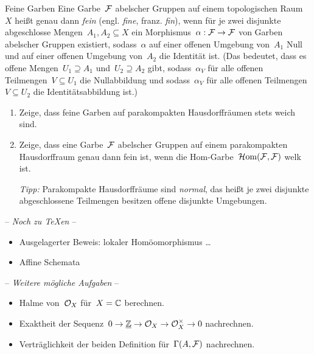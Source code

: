 \documentclass{uebblatt}
\begin{document}
\begin{aufgabe}{Feine Garben}
Eine Garbe~$\mathcal{F}$ abelscher Gruppen auf einem topologischen Raum~$X$ heißt genau dann \emph{fein}
(engl. \emph{fine}, franz. \emph{fin}), wenn für je zwei disjunkte abgeschlosse
Mengen~$A_1, A_2 \subseteq X$ ein Morphismus~$\alpha : \mathcal{F} \to \mathcal{F}$ von Garben
abelscher Gruppen existiert, sodass~$\alpha$ auf einer offenen Umgebung
von~$A_1$ Null und auf einer offenen Umgebung von~$A_2$ die Identität ist.
(Das bedeutet, dass es offene Mengen~$U_1 \supseteq A_1$
und~$U_2 \supseteq A_2$ gibt, sodass~$\alpha_V$ für alle offenen Teilmengen~$V
\subseteq U_1$ die Nullabbildung und sodass~$\alpha_V$ für alle offenen
Teilmengen~$V \subseteq U_2$ die Identitätsabbildung ist.)

\begin{enumerate}
\item Zeige, dass feine Garben auf parakompakten Hausdorffräumen stets weich
sind.
\item Zeige, dass eine Garbe~$\mathcal{F}$ abelscher Gruppen auf einem parakompakten
Hausdorffraum genau dann fein ist, wenn die Hom-Garbe~$\mathcal{H}\mathrm{om}(\mathcal{F},\mathcal{F})$ welk ist.

\emph{Tipp:} Parakompakte Hausdorffräume sind \emph{normal}, das heißt
je zwei disjunkte abgeschlossene Teilmengen besitzen offene disjunkte
Umgebungen.
\end{enumerate}
\end{aufgabe}

\begin{center}-- \emph{Noch zu \TeX{}en} --\end{center}
\begin{itemize}
\item Ausgelagerter Beweis: lokaler Homöomorphismus \ldots
\item Affine Schemata
\end{itemize}

\begin{center}-- \emph{Weitere mögliche Aufgaben} --\end{center}
\begin{itemize}
\item Halme von~$\mathcal{O}_X$ für~$X = \mathbb{C}$ berechnen.
\item Exaktheit der Sequenz~$0 \to \underline{\mathbb{Z}} \to \mathcal{O}_X \to \mathcal{O}_X^\times \to 0$
nachrechnen.
\item Verträglichkeit der beiden Definition für~$\Gamma(A,\mathcal{F})$ nachrechnen.
\end{itemize}
\end{document}
